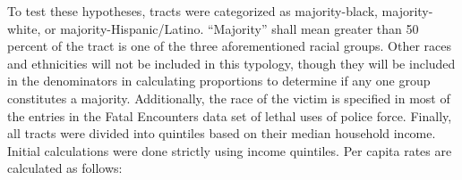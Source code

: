 \documentclass[12pt]{article}
\begin{document}


To test these hypotheses, tracts were categorized as majority-black, majority-white, or majority-Hispanic/Latino. “Majority” shall mean greater than 50 percent of the tract is one of the three aforementioned racial groups. Other races and ethnicities will not be included in this typology, though they will be included in the denominators in calculating proportions to determine if any one group constitutes a majority. Additionally, the race of the victim is specified in most of the entries in the Fatal Encounters data set of lethal uses of police force. Finally, all tracts were divided into quintiles based on their median household income. Initial calculations were done strictly using income quintiles. Per capita rates are calculated as follows:
\end{document}
